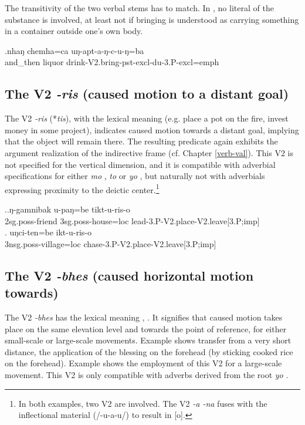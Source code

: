 The transitivity of the two verbal stems has to match. In \Next, no literal  of the substance is involved, at least not if bringing is understood as carrying something in a container outside one's own body.

\exg.nhaŋ chemha=ca uŋ-apt-a-ŋ-c-u-ŋ=ba\\
and\_then liquor  drink{\sc -V2.bring-pst-excl-du-3.P-excl=emph}\\


\subsection{The V2 \emph{-ris} (caused motion to a distant goal)}\label{V2-place}%

The V2 \emph{-ris} (*\emph{tis}), with the lexical meaning  (e.g. place a pot on the fire, invest money in some project),  indicates caused motion towards a distant goal, implying that the object will remain there. The resulting predicate again exhibits  the argument realization of the indirective frame (cf. Chapter \ref{verb-val}). This V2 is not specified for the vertical dimension, and it is compatible with adverbial specifications for either \emph{mo} , \emph{to}  or \emph{yo} , but naturally not with adverbials expressing proximity to the deictic center.\footnote{In both examples, two V2 are involved. The V2 \emph{-a \ti -na}  fuses with the inflectional material (/-u-a-u/) to result in [o].}

\ex.\ag.ŋ-gamnibak  u-paŋ=be tikt-u-ris-o\\
{\sc 2sg.poss-}friend {\sc 3sg.poss-}house{\sc =loc}  lead{\sc -3.P-V2.place-V2.leave[3.P;imp]}\\
\bg. uŋci-ten=be ikt-u-ris-o\\
{\sc 3nsg.poss-}village{\sc =loc} chase{\sc -3.P-V2.place-V2.leave[3.P;imp]}\\
 

\subsection{The V2 \emph{-bhes} (caused horizontal motion towards)} \label{V2-bhes}%

The V2 \emph{-bhes}  has the lexical meaning , . It signifies that  caused motion takes place on the same elevation  level and towards the point of reference, for either  small-scale or large-scale movements.  Example \Next[a] shows  transfer from a very short distance, the application of the blessing on the forehead (by sticking cooked rice on the forehead). Example \Next[b] shows the employment of this V2 for a large-scale movement. This V2 is only compatible with adverbs derived from the root \emph{yo} . 


